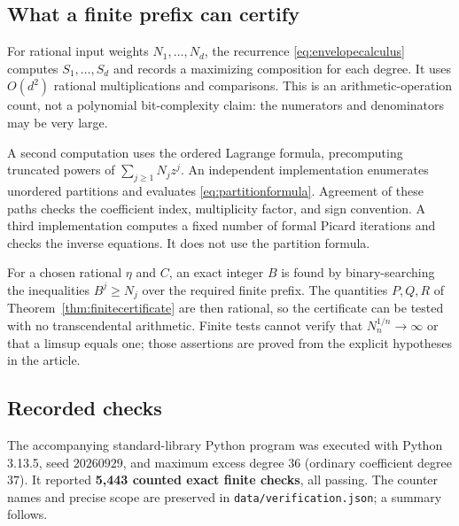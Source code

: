 \documentclass[11pt,a4paper]{article}
\numberwithin{equation}{section}
\theoremstyle{definition}
\theoremstyle{remark}
\begin{document}
\subsection{What a finite prefix can certify}

For rational input weights $N_1,\ldots,N_d$, the recurrence
\eqref{eq:envelopecalculus} computes $S_1,\ldots,S_d$ and records a
maximizing composition for each degree. It uses $O(d^2)$ rational
multiplications and comparisons. This is an arithmetic-operation count,
not a polynomial bit-complexity claim: the numerators and denominators
may be very large.

A second computation uses the ordered Lagrange formula, precomputing
truncated powers of $\sum_{j\ge1}N_jz^j$. An independent implementation
enumerates unordered partitions and evaluates
\eqref{eq:partitionformula}. Agreement of these paths checks the
coefficient index, multiplicity factor, and sign convention. A third
implementation computes a fixed number of formal Picard iterations and
checks the inverse equations. It does not use the partition formula.

For a chosen rational $\eta$ and $C$, an exact integer $B$ is found by
binary-searching the inequalities $B^j\ge N_j$ over the required finite
prefix. The quantities $P,Q,R$ of
Theorem~\ref{thm:finitecertificate} are then rational, so the certificate
can be tested with no transcendental arithmetic. Finite tests cannot
verify that $N_n^{1/n}\to\infty$ or that a limsup equals one; those
assertions are proved from the explicit hypotheses in the article.

\subsection{Recorded checks}

The accompanying standard-library Python program was executed with
Python 3.13.5, seed $20260929$, and maximum excess degree $36$ (ordinary
coefficient degree $37$). It reported \textbf{5,443 counted exact finite
checks}, all passing. The counter names and precise scope are preserved
in \texttt{data/verification.json}; a summary follows.
\end{document}
